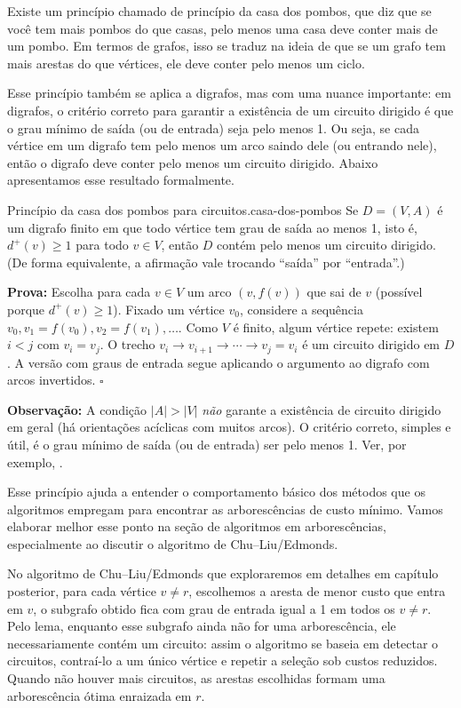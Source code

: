 Existe um princípio chamado de princípio da casa dos pombos, que diz que se você tem mais pombos do que casas, pelo menos uma casa deve conter mais de um pombo. Em termos de grafos, isso se traduz na ideia de que se um grafo tem mais arestas do que vértices, ele deve conter pelo menos um ciclo.


Esse princípio também se aplica a digrafos, mas com uma nuance importante: em digrafos, o critério correto para garantir a existência de um circuito dirigido é que o grau mínimo de saída (ou de entrada) seja pelo menos 1. Ou seja, se cada vértice em um digrafo tem pelo menos um arco saindo dele (ou entrando nele), então o digrafo deve conter pelo menos um circuito dirigido. Abaixo apresentamos esse resultado formalmente.


\begin{lemabox}{Princípio da casa dos pombos para circuitos.}{casa-dos-pombos}
	Se \(D=(V,A)\) é um digrafo finito em que todo vértice tem grau de saída ao menos 1, isto é, \(d^+(v)\ge 1\) para todo \(v\in V\), então \(D\) contém pelo menos um circuito dirigido. (De forma equivalente, a afirmação vale trocando ``saída'' por ``entrada''.)


	\textbf{Prova:} Escolha para cada \(v\in V\) um arco \((v,f(v))\) que sai de \(v\) (possível porque \(d^+(v)\ge 1\)). Fixa\-do um vértice \(v_0\), considere a sequência \(v_0, v_1=f(v_0), v_2=f(v_1),\dots\). Como \(V\) é finito, algum vértice repete: existem \(i<j\) com \(v_i=v_j\). O trecho \(v_i\to v_{i+1}\to\cdots\to v_j=v_i\) é um circuito dirigido em \(D\). A versão com graus de entrada segue aplicando o argumento ao digrafo com arcos invertidos. \hfill$\square$


	\smallskip
	\textbf{Observação:} A condição \(|A|>|V|\) \emph{não} garante a existência de circuito dirigido em geral (há orientações acíclicas com muitos arcos). O critério correto, simples e útil, é o grau mínimo de saída (ou de entrada) ser pelo menos 1. Ver, por exemplo, \cite{schrijver2003comb}.

\end{lemabox}


Esse princípio ajuda a entender o comportamento básico dos métodos que os algoritmos empregam para encontrar as arborescências de custo mínimo. Vamos elaborar melhor esse ponto na seção de algoritmos em arborescências, especialmente ao discutir o algoritmo de Chu--Liu/Edmonds.


No algoritmo de Chu--Liu/Edmonds que exploraremos em detalhes em capítulo posterior, para cada vértice \(v\neq r\), escolhemos a aresta de menor custo que entra em \(v\), o subgrafo obtido fica com grau de entrada igual a 1 em todos os \(v\neq r\). Pelo lema, enquanto esse subgrafo ainda não for uma arborescência, ele necessariamente contém um circuito: assim o algoritmo se baseia em detectar o circuitos, contraí-lo a um único vértice e repetir a seleção sob custos reduzidos. Quando não houver mais circuitos, as arestas escolhidas formam uma arborescência ótima enraizada em \(r\).

